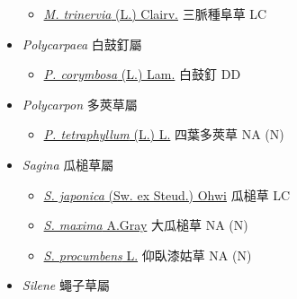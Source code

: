 \begin{itemize}
  \begin{itemize}
        \item[] \href{http://www.theplantlist.org/tpl1.1/search?q=Moehringia+trinervia}{\textit{M. trinervia} (L.) Clairv.}   三脈種阜草   LC
  \end{itemize}
 \item[] \textit{Polycarpaea} 白鼓釘屬
                                
  \begin{itemize}
        \item[] \href{http://www.theplantlist.org/tpl1.1/search?q=Polycarpaea+corymbosa}{\textit{P. corymbosa} (L.) Lam.}   白鼓釘   DD
  \end{itemize}
 \item[] \textit{Polycarpon} 多莢草屬
                                
  \begin{itemize}
        \item[] \href{http://www.theplantlist.org/tpl1.1/search?q=Polycarpon+tetraphyllum}{\textit{P. tetraphyllum} (L.) L.}   四葉多莢草   NA (N)
  \end{itemize}
 \item[] \textit{Sagina} 瓜槌草屬
                                
  \begin{itemize}
        \item[] \href{http://www.theplantlist.org/tpl1.1/search?q=Sagina+japonica}{\textit{S. japonica} (Sw. ex Steud.) Ohwi}   瓜槌草   LC
        \item[] \href{http://www.theplantlist.org/tpl1.1/search?q=Sagina+maxima}{\textit{S. maxima} A.Gray}   大瓜槌草   NA (N)
        \item[] \href{http://www.theplantlist.org/tpl1.1/search?q=Sagina+procumbens}{\textit{S. procumbens} L.}   仰臥漆姑草   NA (N)
  \end{itemize}
 \item[] \textit{Silene} 蠅子草屬
                                

\end{itemize}
